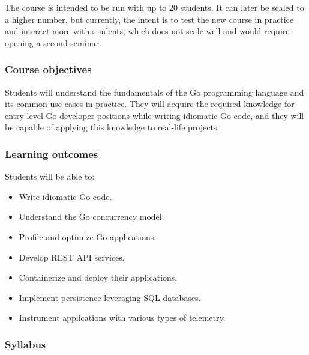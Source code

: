 \documentclass[
  digital,
  color,
  oneside,
  nosansbold,
  nocolorbold,
  lof,
  nolot,
]{fithesis4}
\begin{document}
The course is intended to be run with up to 20 students. It can later be scaled to a higher number, but currently, the intent is to test the new course in practice and interact more with students, which does not scale well and would require opening a second seminar.

\subsubsection{Course objectives}

Students will understand the fundamentals of the Go programming language and its common use cases in practice. They will acquire the required knowledge for entry-level Go developer positions while writing idiomatic Go code, and they will be capable of applying this knowledge to real-life projects.

\subsubsection{Learning outcomes}

Students will be able to:
\begin{itemize}
    \item Write idiomatic Go code.
    \item Understand the Go concurrency model.
    \item Profile and optimize Go applications.
    \item Develop REST API services.
    \item Containerize and deploy their applications.
    \item Implement persistence leveraging SQL databases.
    \item Instrument applications with various types of telemetry.
\end{itemize}

\subsubsection{Syllabus}
\end{document}
